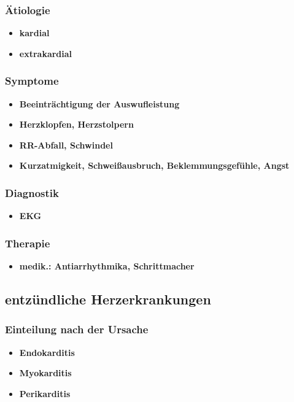 	\subsubsection{Ätiologie}
		\begin{itemize}
			\item \textbf{kardial}
			\item \textbf{extrakardial}
		\end{itemize}
	\subsubsection{Symptome}
		\begin{itemize}
			\item \textbf{Beeinträchtigung der Auswufleistung}
			\item \textbf{Herzklopfen, Herzstolpern}
			\item \textbf{RR-Abfall, Schwindel}
			\item \textbf{Kurzatmigkeit, Schweißausbruch, Beklemmungsgefühle, Angst}
		\end{itemize}
	\subsubsection{Diagnostik}
		\begin{itemize}
			\item \textbf{EKG}
		\end{itemize}
	\subsubsection{Therapie}
		\begin{itemize}
			\item \textbf{medik.: Antiarrhythmika, Schrittmacher}
		\end{itemize}
\subsection{entzündliche Herzerkrankungen}
	\subsubsection{Einteilung nach der Ursache}
		\begin{itemize}
			\item \textbf{Endokarditis}
			\item \textbf{Myokarditis}
			\item \textbf{Perikarditis}
		\end{itemize}
